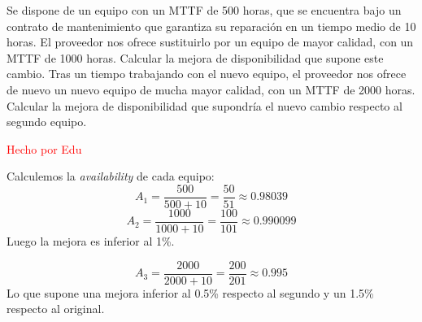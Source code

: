 \begin{problem}[1]
Se dispone de un equipo con un MTTF de 500 horas, que se encuentra bajo un contrato de mantenimiento que garantiza su reparación en un tiempo medio de 10 horas.
  \ppart El proveedor nos ofrece sustituirlo por un equipo de mayor calidad, con un MTTF de 1000 horas. Calcular la mejora de disponibilidad que supone este cambio.
  \ppart Tras un tiempo trabajando con el nuevo equipo, el proveedor nos ofrece de nuevo un nuevo equipo de mucha mayor calidad, con un MTTF de 2000 horas. Calcular la mejora de disponibilidad que supondría el nuevo cambio respecto al segundo equipo.

\solution
\textcolor{red}{Hecho por Edu}

\spart
  Calculemos la \textit{availability} de cada equipo:
  \[ A_1 = \frac{500}{500+10} = \frac{50}{51} \approx 0.98039 \]
  \[ A_2 = \frac{1000}{1000+10} = \frac{100}{101} \approx 0.990099 \]
  Luego la mejora es inferior al 1\%.

\spart
  \[ A_3 = \frac{2000}{2000+10} = \frac{200}{201} \approx 0.995 \]
  Lo que supone una mejora inferior al 0.5\% respecto al segundo y un 1.5\% respecto al original.

\end{problem}


